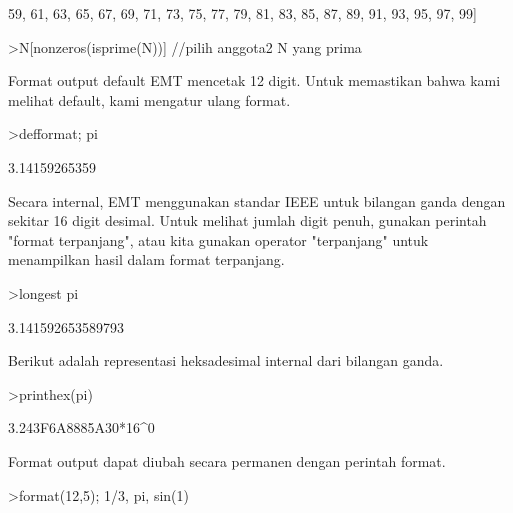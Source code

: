 \documentclass[a4paper,10pt]{article}
\begin{document}
\begin{eulernotebook}
\begin{euleroutput}
  59,  61,  63,  65,  67,  69,  71,  73,  75,  77,  79,  81,  83,  85,
  87,  89,  91,  93,  95,  97,  99]
\end{euleroutput}
\begin{eulerprompt}
>N[nonzeros(isprime(N))] //pilih anggota2 N yang prima
\end{eulerprompt}
\begin{euleroutput}
  [2,  3,  5,  7,  11,  13,  17,  19,  23,  29,  31,  37,  41,  43,  47,
  53,  59,  61,  67,  71,  73,  79,  83,  89,  97]
\end{euleroutput}
\begin{eulercomment}
Format output default EMT mencetak 12 digit. Untuk memastikan bahwa
kami melihat default, kami mengatur ulang format.
\end{eulercomment}
\begin{eulerprompt}
>defformat; pi
\end{eulerprompt}
\begin{euleroutput}
  3.14159265359
\end{euleroutput}
\begin{eulercomment}
Secara internal, EMT menggunakan standar IEEE untuk bilangan ganda
dengan sekitar 16 digit desimal. Untuk melihat jumlah digit penuh,
gunakan perintah "format terpanjang", atau kita gunakan operator
"terpanjang" untuk menampilkan hasil dalam format terpanjang.
\end{eulercomment}
\begin{eulerprompt}
>longest pi
\end{eulerprompt}
\begin{euleroutput}
        3.141592653589793 
\end{euleroutput}
\begin{eulercomment}
Berikut adalah representasi heksadesimal internal dari bilangan ganda.
\end{eulercomment}
\begin{eulerprompt}
>printhex(pi)
\end{eulerprompt}
\begin{euleroutput}
  3.243F6A8885A30*16^0
\end{euleroutput}
\begin{eulercomment}
Format output dapat diubah secara permanen dengan perintah format.
\end{eulercomment}
\begin{eulerprompt}
>format(12,5); 1/3, pi, sin(1)
\end{eulerprompt}
\begin{euleroutput}

\end{euleroutput}
\end{eulernotebook}
\end{document}
